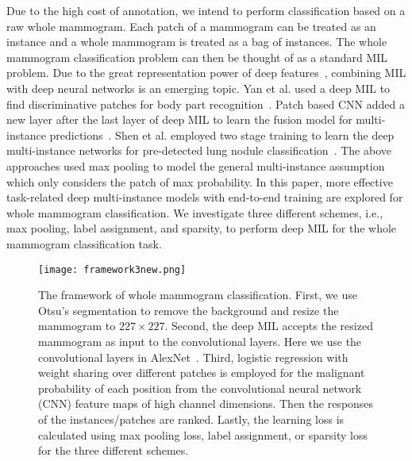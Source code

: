 \documentclass[runningheads,a4paper]{llncs}
\begin{document}
Due to the high cost of annotation, we intend to perform classification based on a raw whole mammogram. Each patch of a mammogram can be treated as an instance and a whole mammogram is treated as a bag of instances. The whole mammogram classification problem can then be thought of as a standard MIL problem. Due to the great representation power of deep features~\cite{greenspan2016guest,zhu2016adversarial,zhu2016co,zhu2015hierarchical}, combining MIL with deep neural networks is an emerging topic. Yan et al. used a deep MIL to find discriminative patches for body part recognition~\cite{yan2016multi}. Patch based CNN added a new layer after the last layer of deep MIL to learn the fusion model for multi-instance predictions~\cite{hou2015patch}. Shen et al. employed two stage training to learn the deep multi-instance networks for pre-detected lung nodule classification~\cite{shen2016learning}. The above approaches used max pooling to model the general multi-instance assumption which only considers the patch of max probability. In this paper, more effective task-related deep multi-instance models with end-to-end training are explored for whole mammogram classification. We investigate three different schemes, i.e., max pooling, label assignment, and sparsity, to perform deep MIL for the whole mammogram classification task.
\begin{figure}[t]
	\setlength{\abovecaptionskip}{0.cm}
	\setlength{\belowcaptionskip}{-0.cm}
	\begin{center}
		\begin{minipage}{0.8\linewidth}
			\centerline{\texttt{[image: framework3new.png]}}
		\end{minipage}
		\caption{The framework of whole mammogram classification. First, we use Otsu's segmentation to remove the background and resize the mammogram to $227\times227$. Second, the deep MIL accepts the resized mammogram as input to the convolutional layers. Here we use the convolutional layers in AlexNet~\cite{krizhevsky2012imagenet}. Third, logistic regression with weight sharing over different patches is employed for the malignant probability of each position from the convolutional neural network (CNN) feature maps of high channel dimensions. Then the responses of the instances/patches are ranked. Lastly, the learning loss is calculated using max pooling loss, label assignment, or sparsity loss for the three different schemes.}
		\label{fig:framework}
	\end{center}
\end{figure}
\end{document}
